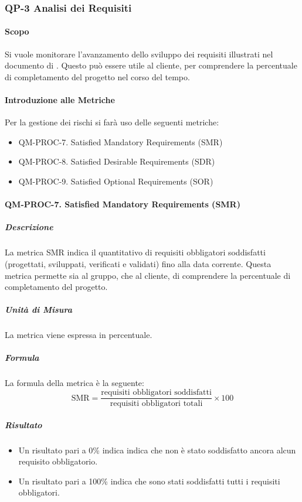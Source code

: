 	\subsubsection{QP-3 Analisi dei Requisiti}

		\paragraph{Scopo}
		
		Si vuole monitorare l'avanzamento dello sviluppo dei requisiti illustrati nel documento di . Questo può essere utile al cliente, per comprendere la percentuale di completamento del progetto nel corso del tempo.

		\paragraph{Introduzione alle Metriche}

		Per la gestione dei rischi si farà uso delle seguenti metriche:

		\begin{itemize}
			\item QM-PROC-7. Satisfied Mandatory Requirements (SMR)
			\item QM-PROC-8. Satisfied Desirable Requirements (SDR)
			\item QM-PROC-9. Satisfied Optional Requirements (SOR)
		\end{itemize}

		\paragraph{QM-PROC-7. Satisfied Mandatory Requirements (SMR)}

			\subparagraph{Descrizione}
			La metrica SMR indica il quantitativo di requisiti obbligatori soddisfatti (progettati, sviluppati, verificati e validati) fino alla data corrente. Questa metrica permette sia al gruppo, che al cliente, di comprendere la percentuale di completamento del progetto. 

			\subparagraph{Unità di Misura}
			La metrica viene espressa in percentuale.

			\subparagraph{Formula}
			La formula della metrica è la seguente:
			\[
				\text{SMR} = \frac{\text{requisiti obbligatori soddisfatti}}{\text{requisiti obbligatori totali}} \times 100
			\]

			\subparagraph{Risultato}
			\begin{itemize}
				\item Un risultato pari a 0\% indica indica che non è stato soddisfatto ancora alcun requisito obbligatorio.
				\item Un risultato pari a 100\% indica che sono stati soddisfatti tutti i requisiti obbligatori.
			\end{itemize}

